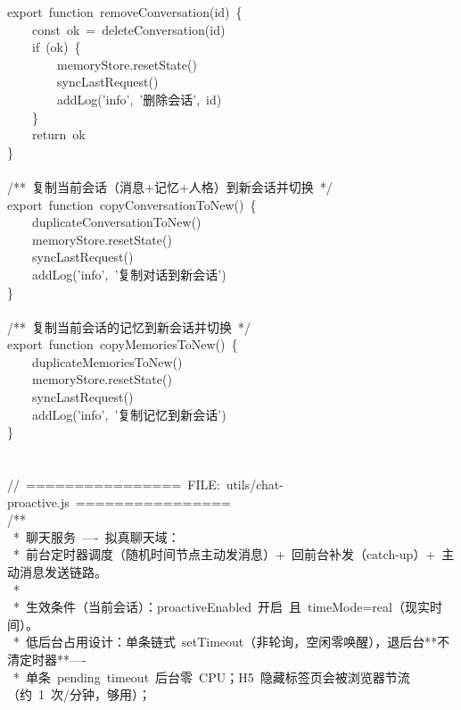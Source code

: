 \documentclass[a4paper,10pt]{article}
\begin{document}
{\ttfamily\footnotesize\raggedright
export~function~removeConversation(id)~\{\\
~~~~const~ok~=~deleteConversation(id)\\
~~~~if~(ok)~\{\\
~~~~~~~~memoryStore.resetState()\\
~~~~~~~~syncLastRequest()\\
~~~~~~~~addLog('info',~'删除会话',~id)\\
~~~~\}\\
~~~~return~ok\\
\}\\
\mbox{}\\
/**~复制当前会话（消息+记忆+人格）到新会话并切换~*/\\
export~function~copyConversationToNew()~\{\\
~~~~duplicateConversationToNew()\\
~~~~memoryStore.resetState()\\
~~~~syncLastRequest()\\
~~~~addLog('info',~'复制对话到新会话')\\
\}\\
\mbox{}\\
/**~复制当前会话的记忆到新会话并切换~*/\\
export~function~copyMemoriesToNew()~\{\\
~~~~duplicateMemoriesToNew()\\
~~~~memoryStore.resetState()\\
~~~~syncLastRequest()\\
~~~~addLog('info',~'复制记忆到新会话')\\
\}\\
\mbox{}\\
\mbox{}\\
//~================~FILE:~utils/chat-proactive.js~================\\
/**\\
~*~聊天服务~----~拟真聊天域：\\
~*~前台定时器调度（随机时间节点主动发消息）+~回前台补发（catch-up）+~主动消息发送链路。\\
~*\\
~*~生效条件（当前会话）：proactiveEnabled~开启~且~timeMode=real（现实时间）。\\
~*~低后台占用设计：单条链式~setTimeout（非轮询，空闲零唤醒），退后台**不清定时器**----\\
~*~单条~pending~timeout~后台零~CPU；H5~隐藏标签页会被浏览器节流（约~1~次/分钟，够用）；\\
}
\end{document}
